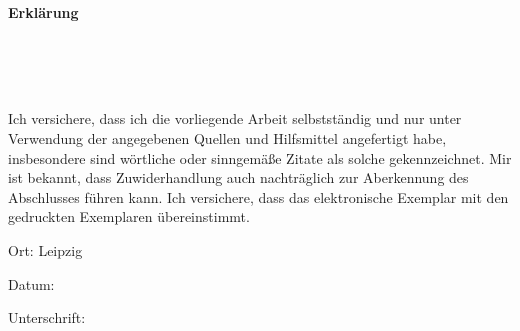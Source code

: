 \documentclass[fontsize=12, a4aper]{scrartcl}
\newcommand\textbox[1]
{
	\parbox{.333\textwidth}{#1}
}
\begin{document}
\newpage

\begin{center}
	
	\fontsize{14pt}{12pt}
	
	\textbf{Erklärung}\\
	
\end{center}

\begin{verbatim}
	
	
	
\end{verbatim}

\noindent Ich versichere, dass ich die vorliegende Arbeit selbstständig und nur unter Verwendung der
angegebenen Quellen und Hilfsmittel angefertigt habe, insbesondere sind wörtliche oder
sinngemäße Zitate als solche gekennzeichnet. Mir ist bekannt, dass Zuwiderhandlung auch
nachträglich zur Aberkennung des Abschlusses führen kann.
Ich versichere, dass das elektronische Exemplar mit den gedruckten Exemplaren übereinstimmt.

\bigskip

\noindent\textbox{Ort: Leipzig\hfill}\textbox{\hfil Datum:\hfil}\textbox{\hfill Unterschrift:}
\end{document}
